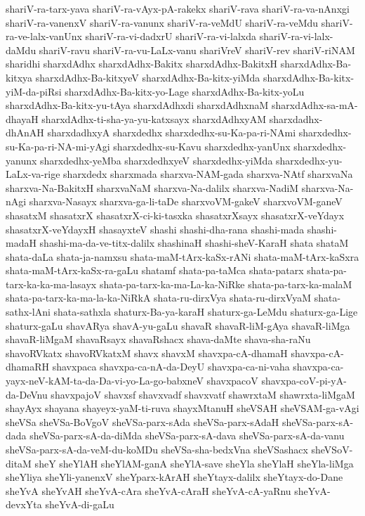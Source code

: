{shariV-ra-tarx-yava
shariV-ra-vAyx-pA-rakekx
shariV-rava
shariV-ra-va-nAnxgi
shariV-ra-vanenxV
shariV-ra-vanunx
shariV-ra-veMdU
shariV-ra-veMdu
shariV-ra-ve-lalx-vanUnx
shariV-ra-vi-dadxrU
shariV-ra-vi-lalxda
shariV-ra-vi-lalx-daMdu
shariV-ravu
shariV-ra-vu-LaLx-vanu
shariVreV
shariV-rev
shariV-riNAM
sharidhi
sharxdAdhx
sharxdAdhx-Bakitx
sharxdAdhx-BakitxH
sharxdAdhx-Ba-kitxya
sharxdAdhx-Ba-kitxyeV
sharxdAdhx-Ba-kitx-yiMda
sharxdAdhx-Ba-kitx-yiM-da-piRsi
sharxdAdhx-Ba-kitx-yo-Lage
sharxdAdhx-Ba-kitx-yoLu
sharxdAdhx-Ba-kitx-yu-tAya
sharxdAdhxdi
sharxdAdhxnaM
sharxdAdhx-sa-mA-dhayaH
sharxdAdhx-ti-sha-ya-yu-katxsayx
sharxdAdhxyAM
sharxdadhx-dhAnAH
sharxdadhxyA
sharxdedhx
sharxdedhx-su-Ka-pa-ri-NAmi
sharxdedhx-su-Ka-pa-ri-NA-mi-yAgi
sharxdedhx-su-Kavu
sharxdedhx-yanUnx
sharxdedhx-yanunx
sharxdedhx-yeMba
sharxdedhxyeV
sharxdedhx-yiMda
sharxdedhx-yu-LaLx-va-rige
sharxdedx
sharxmada
sharxva-NAM-gada
sharxva-NAtf
sharxvaNa
sharxva-Na-BakitxH
sharxvaNaM
sharxva-Na-dalilx
sharxva-NadiM
sharxva-Na-nAgi
sharxva-Nasayx
sharxva-ga-li-taDe
sharxvoVM-gakeV
sharxvoVM-ganeV
shasatxM
shasatxrX
shasatxrX-ci-ki-tasxka
shasatxrXsayx
shasatxrX-veYdayx
shasatxrX-veYdayxH
shasayxteV
shashi
shashi-dha-rana
shashi-mada
shashi-madaH
shashi-ma-da-ve-titx-dalilx
shashinaH
shashi-sheV-KaraH
shata
shataM
shata-daLa
shata-ja-namxsu
shata-maM-tArx-kaSx-rANi
shata-maM-tArx-kaSxra
shata-maM-tArx-kaSx-ra-gaLu
shatamf
shata-pa-taMca
shata-patarx
shata-pa-tarx-ka-ka-ma-lasayx
shata-pa-tarx-ka-ma-La-ka-NiRke
shata-pa-tarx-ka-malaM
shata-pa-tarx-ka-ma-la-ka-NiRkA
shata-ru-dirxVya
shata-ru-dirxVyaM
shata-sathx-lAni
shata-sathxla
shaturx-Ba-ya-karaH
shaturx-ga-LeMdu
shaturx-ga-Lige
shaturx-gaLu
shavARya
shavA-yu-gaLu
shavaR
shavaR-liM-gAya
shavaR-liMga
shavaR-liMgaM
shavaRsayx
shavaRshacx
shava-daMte
shava-sha-raNu
shavoRVkatx
shavoRVkatxM
shavx
shavxM
shavxpa-cA-dhamaH
shavxpa-cA-dhamaRH
shavxpaca
shavxpa-ca-nA-da-DeyU
shavxpa-ca-ni-vaha
shavxpa-ca-yayx-neV-kAM-ta-da-Da-vi-yo-La-go-babxneV
shavxpacoV
shavxpa-coV-pi-yA-da-DeVnu
shavxpajoV
shavxsf
shavxvadf
shavxvatf
shawrxtaM
shawrxta-liMgaM
shayAyx
shayana
shayeyx-yaM-ti-ruva
shayxMtanuH
sheVSAH
sheVSAM-ga-vAgi
sheVSa
sheVSa-BoVgoV
sheVSa-parx-sAda
sheVSa-parx-sAdaH
sheVSa-parx-sA-dada
sheVSa-parx-sA-da-diMda
sheVSa-parx-sA-dava
sheVSa-parx-sA-da-vanu
sheVSa-parx-sA-da-veM-du-koMDu
sheVSa-sha-bedxVna
sheVSashacx
sheVSoV-ditaM
sheY
sheYlAH
sheYlAM-ganA
sheYlA-save
sheYla
sheYlaH
sheYla-liMga
sheYliya
sheYli-yanenxV
sheYparx-kArAH
sheYtayx-dalilx
sheYtayx-do-Dane
sheYvA
sheYvAH
sheYvA-cAra
sheYvA-cAraH
sheYvA-cA-yaRnu
sheYvA-devxYta
sheYvA-di-gaLu
}
